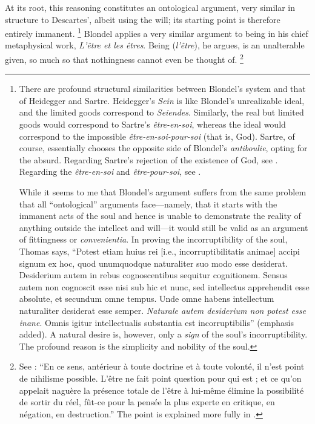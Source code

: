 %
At its root, this reasoning constitutes an ontological argument, very similar in structure to Descartes’, albeit using the will; its starting point is therefore entirely immanent.%
%
\footnote{There are profound structural similarities between Blondel’s system and that of Heidegger and Sartre. Heidegger’s \emph{Sein} is like Blondel’s unrealizable ideal, and the limited goods correspond to \emph{Seiendes}. Similarly, the real but limited goods would correspond to Sartre’s \emph{être-en-soi}, whereas the ideal would correspond to the impossible \emph{être-en-soi-pour-soi} (that is, God). Sartre, of course, essentially chooses the opposite side of Blondel’s \emph{antiboulie}, opting for the absurd. Regarding Sartre’s rejection of the existence of God, see \cite[32–35]{lucas:orizzonte}. Regarding the \emph{être-en-soi} and \emph{être-pour-soi}, see \cite[115–119]{definance:essai}.

While it seems to me that Blondel’s argument suffers from the same problem that all “ontological” arguments face—namely, that it starts with the immanent acts of the soul and hence is unable to demonstrate the reality of anything outside the intellect and will—it would still be valid as an argument of fittingness or \emph{convenientia}. In proving the incorruptibility of the soul, Thomas says,
“Potest etiam huius rei [i.e., incorruptibilitatis animae] accipi signum ex hoc, quod unumquodque naturaliter suo modo esse desiderat. Desiderium autem in rebus cognoscentibus sequitur cognitionem. Sensus autem non cognoscit esse nisi sub hic et nunc, sed intellectus apprehendit esse absolute, et secundum omne tempus. Unde omne habens intellectum naturaliter desiderat esse semper. \emph{Naturale autem desiderium non potest esse inane}. Omnis igitur intellectualis substantia est incorruptibilis” (emphasis added).
A natural desire is, however, only a \emph{sign} of the soul’s incorruptibility. The profound reason is the simplicity and nobility of the soul.}
%
Blondel applies a very similar argument to being in his chief metaphysical work, \emph{L’être et les êtres}. Being (\emph{l’être}), he argues, is an unalterable given, so much so that nothingness cannot even be thought of.%
%
\footnote{See \cite[8]{blondel:etre}: “En ce sens, antérieur à toute doctrine et à toute volonté, il n’est point de nihilisme possible. L’être ne fait point question pour qui est ; et ce qu’on appelait naguère la présence totale de l’être à lui-même élimine la possibilité de sortir du réel, fût-ce pour la pensée la plus experte en critique, en négation, en destruction.” The point is explained more fully in \cite[37–38]{blondel:etre}.}
